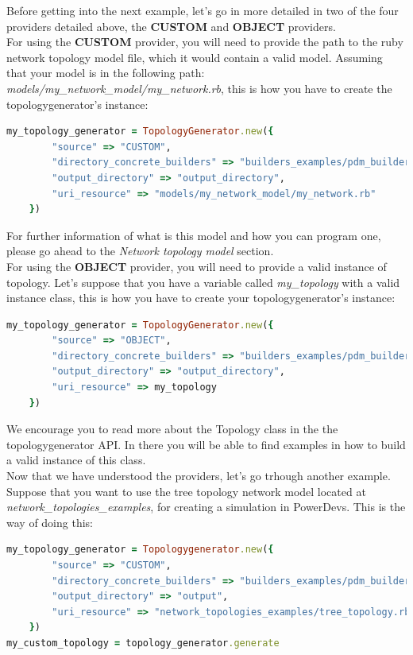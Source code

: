 Before getting into the next example, let's go in more detailed in two of the four providers detailed above, the \textbf{CUSTOM} and \textbf{OBJECT} providers.\\
For using the \textbf{CUSTOM} provider, you will need to provide the path to the ruby network topology model file, which it would contain a valid model. Assuming that your model is in the following path: \textit{models/my\_network\_model/my\_network.rb}, this is how you have to create the topologygenerator's instance:

\begin{lstlisting}[language=Ruby,breaklines=true]
my_topology_generator = TopologyGenerator.new({
        "source" => "CUSTOM",
        "directory_concrete_builders" => "builders_examples/pdm_builders",
        "output_directory" => "output_directory",
        "uri_resource" => "models/my_network_model/my_network.rb"
    })
\end{lstlisting}

For further information of what is this model and how you can program one, please go ahead to the \textit{Network topology model} section.\\

For using the \textbf{OBJECT} provider, you will need to provide a valid instance of topology. Let's suppose that you have a variable called \textit{my\_topology} with a valid instance class, this is how you have to create your topologygenerator's instance:

\begin{lstlisting}[language=Ruby,breaklines=true]
my_topology_generator = TopologyGenerator.new({
        "source" => "OBJECT",
        "directory_concrete_builders" => "builders_examples/pdm_builders",
        "output_directory" => "output_directory",
        "uri_resource" => my_topology
    })
\end{lstlisting}

We encourage you to read more about the Topology class in the the topologygenerator API. In there you will be able to find examples in how to build a valid instance of this class.\\

Now that we have understood the providers, let's go trhough another example. Suppose that you want to use the tree topology network model located at \textit{network\_topologies\_examples}, for creating a simulation in PowerDevs. This is the way of doing this:

\begin{lstlisting}[language=Ruby,breaklines=true]
my_topology_generator = Topologygenerator.new({
        "source" => "CUSTOM",
        "directory_concrete_builders" => "builders_examples/pdm_builders",
        "output_directory" => "output",
        "uri_resource" => "network_topologies_examples/tree_topology.rb" 
    })
my_custom_topology = topology_generator.generate
\end{lstlisting}


